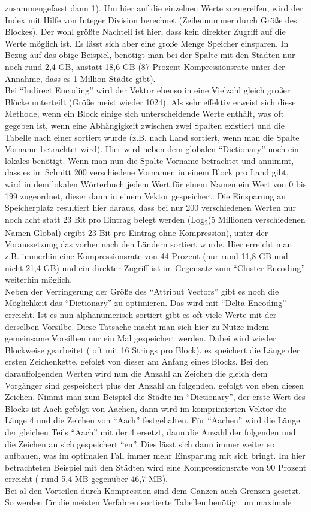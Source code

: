 \documentclass[a4paper, 12pt]{scrartcl}
\begin{document}
zusammengefasst dann 1). Um hier auf die  einzelnen Werte zuzugreifen, wird der Index mit Hilfe von Integer Division berechnet (Zeilennummer durch Größe des Blockes). Der wohl größte Nachteil ist hier, dass kein direkter Zugriff auf die Werte möglich ist. Es lässt sich aber eine große Menge Speicher einsparen. In Bezug auf das obige Beispiel, benötigt man bei der Spalte mit den Städten nur noch rund 2,4 GB, anstatt 18,6 GB (87 Prozent Kompressionsrate unter der Annahme, dass es 1 Million Städte gibt).\\ Bei "`Indirect Encoding"' wird der Vektor ebenso in eine Vielzahl gleich großer Blöcke unterteilt (Größe meist wieder 1024). Als sehr effektiv erweist sich diese Methode, wenn ein Block einige sich unterscheidende Werte enthält, was oft gegeben ist, wenn eine Abhängigkeit zwischen zwei Spalten existiert und die Tabelle nach einer sortiert wurde (z.B. nach Land sortiert, wenn man die Spalte Vorname betrachtet wird). Hier wird neben dem globalen "`Dictionary"' noch ein lokales benötigt. Wenn man nun die Spalte Vorname betrachtet und annimmt, dass es im Schnitt 200 verschiedene Vornamen in einem Block pro Land gibt, wird in dem lokalen Wörterbuch jedem Wert für einem Namen ein Wert von 0 bis 199 zugeordnet, dieser dann in einem Vektor gespeichert. Die Einsparung an Speicherplatz resultiert hier daraus, dass bei nur 200 verschiedenen Werten nur noch acht statt 23 Bit pro Eintrag belegt werden (Log\textsubscript{2}(5 Millionen verschiedenen Namen Global) ergibt 23 Bit pro Eintrag ohne Kompression), unter der Voraussetzung das vorher nach den Ländern sortiert wurde. Hier erreicht man z.B. immerhin eine Kompressionsrate von 44 Prozent (nur rund 11,8 GB und nicht 21,4 GB) und ein direkter Zugriff ist im Gegensatz zum "`Cluster Encoding"' weiterhin möglich.\\ Neben der Verringerung der Größe des "`Attribut Vectors"' gibt es noch die Möglichkeit das "`Dictionary"' zu optimieren. Das wird mit "`Delta Encoding"' erreicht. Ist es nun alphanumerisch sortiert gibt es oft viele Werte mit der derselben Vorsilbe. Diese Tatsache macht man sich hier zu Nutze indem gemeinsame Vorsilben nur ein Mal gespeichert werden. Dabei wird wieder Blockweise gearbeitet ( oft mit 16 Strings pro Block). es speichert die Länge der ersten Zeichenkette, gefolgt von dieser am Anfang eines Blocks. Bei den darauffolgenden Werten wird nun die Anzahl an Zeichen die gleich dem Vorgänger sind gespeichert plus der Anzahl an folgenden, gefolgt von eben diesen Zeichen. Nimmt man zum Beispiel die Städte im "`Dictionary"', der erste Wert des Blocks ist Aach gefolgt von Aachen, dann wird im komprimierten Vektor die Länge 4 und die Zeichen von "`Aach"' festgehalten. Für "`Aachen"' wird die Länge der gleichen Teils "`Aach"' mit der 4 ersetzt, dann die Anzahl der folgenden und die Zeichen an sich gespeichert "`en"'. Dies lässt sich dann immer weiter so aufbauen, was im optimalen Fall immer mehr Einsparung mit sich bringt. Im hier betrachteten Beispiel mit den Städten wird eine Kompressionsrate von 90 Prozent erreicht ( rund 5,4 MB gegenüber 46,7 MB). \\ Bei al den Vorteilen durch Kompression sind dem Ganzen auch Grenzen gesetzt. So werden für die meisten Verfahren sortierte Tabellen benötigt um maximale 
\end{document}
